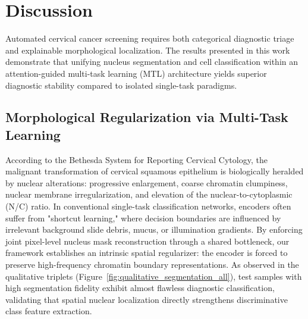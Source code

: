 \documentclass[pdflatex,sn-nature]{sn-jnl}%
\theoremstyle{thmstyleone}%
\theoremstyle{thmstyletwo}%
\theoremstyle{thmstylethree}%
\begin{document}
\section{Discussion}\label{sec6}



Automated cervical cancer screening requires both categorical diagnostic triage and explainable morphological localization. The results presented in this work demonstrate that unifying nucleus segmentation and cell classification within an attention-guided multi-task learning (MTL) architecture yields superior diagnostic stability compared to isolated single-task paradigms.

\subsection{Morphological Regularization via Multi-Task Learning}
According to the Bethesda System for Reporting Cervical Cytology, the malignant transformation of cervical squamous epithelium is biologically heralded by nuclear alterations: progressive enlargement, coarse chromatin clumpiness, nuclear membrane irregularization, and elevation of the nuclear-to-cytoplasmic (N/C) ratio. In conventional single-task classification networks, encoders often suffer from "shortcut learning," where decision boundaries are influenced by irrelevant background slide debris, mucus, or illumination gradients. By enforcing joint pixel-level nucleus mask reconstruction through a shared bottleneck, our framework establishes an intrinsic spatial regularizer: the encoder is forced to preserve high-frequency chromatin boundary representations. As observed in the qualitative triplets (Figure~\ref{fig:qualitative_segmentation_all}), test samples with high segmentation fidelity exhibit almost flawless diagnostic classification, validating that spatial nuclear localization directly strengthens discriminative class feature extraction.
\end{document}
